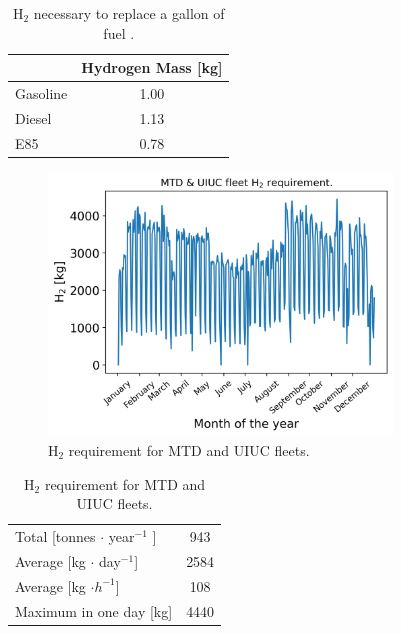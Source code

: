 	\begin{table}[htbp!]
	\centering
	\caption{H$_2$ necessary to replace a gallon of fuel \cite{doe_office_of_energy_efficiency_and_renewable_energy_hydrogen_2020} \cite{alternative_fuels_data_center_fuel_2014}.}
	\begin{tabular}{lc}
	    \toprule
	 	                 & Hydrogen Mass [kg] \\
	    \midrule
	 	Gasoline         & 1.00               \\
	 	Diesel           & 1.13               \\
	 	E85              & 0.78               \\ 
	 	\bottomrule
	\end{tabular}
	\label{tab:equiv}
	\end{table}

	\begin{figure}[htbp!]
	    \centering
		\includegraphics[height=7.0cm]{figures-hydro/hydro-fleet}
		\hfill
		\caption{H$_2$ requirement for MTD and UIUC fleets.}
		\label{fig:hydro-fleet}
	\end{figure}

	\begin{table}[htbp!]
		\centering
	    \caption{H$_2$ requirement for MTD and UIUC fleets.}
		\begin{tabular}{l|c}
		\toprule
		Total [tonnes $\cdot$ year$^{-1}$ ]     & 943    \\
		Average [kg $\cdot$ day$^{-1}$] 	    & 2584   \\
		Average [kg $\cdot h^{-1}$] 		    & 108    \\
		Maximum in one day [kg] & 4440   \\
		\bottomrule
        \end{tabular}
        \label{tab:hydro-fleet}
	\end{table}

